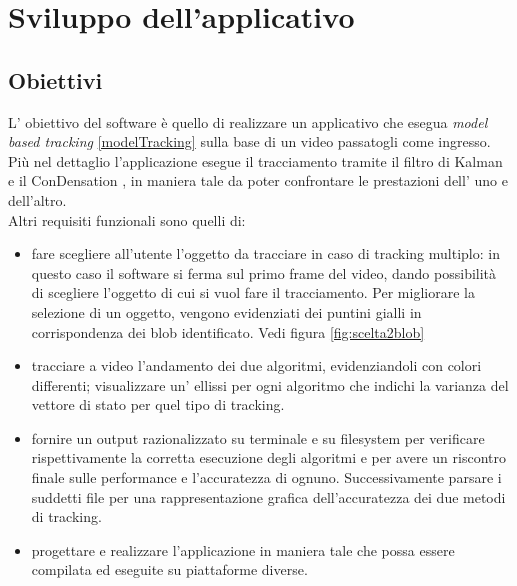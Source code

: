 
\section{Sviluppo dell'applicativo}

\subsection{Obiettivi}
L' obiettivo del software è quello di realizzare un applicativo che esegua \textit{model based tracking} \ref{modelTracking} sulla base di un video passatogli come ingresso. Più nel dettaglio l'applicazione esegue il tracciamento tramite il filtro di Kalman \cite{kalman-intro} e il ConDensation \cite{kalman-condense}, in maniera tale da poter confrontare le prestazioni dell' uno e dell'altro.\\
Altri requisiti funzionali sono quelli di:

\begin{itemize}
 \item  fare scegliere all'utente l'oggetto da tracciare in caso di tracking multiplo: in questo caso il software si ferma sul primo frame del video, dando possibilità di scegliere l'oggetto di cui si vuol fare il tracciamento. Per migliorare la selezione di un oggetto, vengono evidenziati dei puntini gialli in corrispondenza dei blob identificato. Vedi figura \ref{fig:scelta2blob}

\item tracciare a video l'andamento dei due algoritmi, evidenziandoli con colori differenti; visualizzare un' ellissi per ogni algoritmo che indichi la varianza del vettore di stato per quel tipo di tracking.

\item fornire un output razionalizzato su terminale e su filesystem per verificare rispettivamente la corretta esecuzione degli algoritmi e per avere un riscontro finale sulle performance e l'accuratezza di ognuno. Successivamente parsare i suddetti file per una rappresentazione grafica dell'accuratezza dei due metodi di tracking.

\item progettare e realizzare l'applicazione in maniera tale che possa essere compilata ed eseguite su piattaforme diverse.


\end{itemize}


